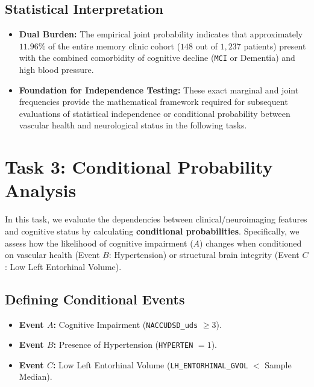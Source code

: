 \documentclass[11pt, a4paper]{article}
\begin{document}
\subsection{Statistical Interpretation}
\begin{itemize}
    \item \textbf{Dual Burden:} The empirical joint probability indicates that approximately $11.96\%$ of the entire memory clinic cohort ($148$ out of $1,237$ patients) present with the combined comorbidity of cognitive decline (\texttt{MCI} or Dementia) and high blood pressure.
    \item \textbf{Foundation for Independence Testing:} These exact marginal and joint frequencies provide the mathematical framework required for subsequent evaluations of statistical independence or conditional probability between vascular health and neurological status in the following tasks.
\end{itemize}

\section{Task 3: Conditional Probability Analysis}
In this task, we evaluate the dependencies between clinical/neuroimaging features and cognitive status by calculating \textbf{conditional probabilities}. Specifically, we assess how the likelihood of cognitive impairment ($A$) changes when conditioned on vascular health (Event $B$: Hypertension) or structural brain integrity (Event $C$: Low Left Entorhinal Volume).

\subsection{Defining Conditional Events}
\begin{itemize}
    \item \textbf{Event $A$:} Cognitive Impairment (\texttt{NACCUDSD\_uds} $\ge 3$).
    \item \textbf{Event $B$:} Presence of Hypertension (\texttt{HYPERTEN} $= 1$).
    \item \textbf{Event $C$:} Low Left Entorhinal Volume (\texttt{LH\_ENTORHINAL\_GVOL} $<$ Sample Median).
\end{itemize}
\end{document}

